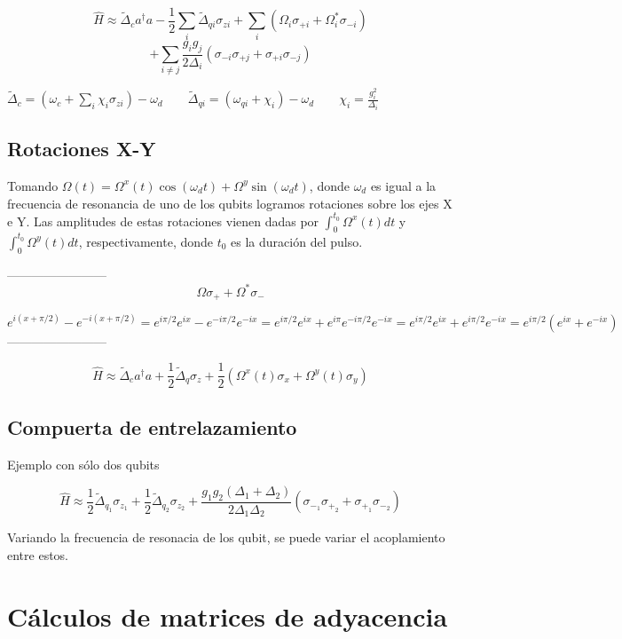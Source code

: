 \documentclass[11pt, spanish]{report}
\begin{document}
$$\hat{H} \approx \tilde{\Delta}_c a^\dagger a - \frac{1}{2} \sum\limits_i \tilde{\Delta}_{qi} \sigma_{zi} + \sum\limits_i (\Omega_i \sigma_{+i} + \Omega_i^* \sigma_{-i})$$
$$+ \sum\limits_{i \neq j} \frac{g_i g_j}{2 \Delta_i} (\sigma_{-i} \sigma_{+j}+\sigma_{+i} \sigma_{-j})$$

$\tilde{\Delta}_c = (\omega_c + \sum\limits_i \chi_i \sigma_{zi}) - \omega_d \qquad \tilde{\Delta}_{qi} = (\omega_{qi} + \chi_i) - \omega_d \qquad \chi_i = \frac{g_i^2}{\Delta_i}$

\section{Rotaciones X-Y}

Tomando $\Omega(t) = \Omega^x(t) \cos(\omega_d t) + \Omega^y \sin(\omega_d t)$, donde $\omega_d$ es igual a la frecuencia de resonancia de uno de los qubits logramos rotaciones sobre los ejes X e Y. Las amplitudes de estas rotaciones vienen dadas por $\int_0^{t_0} \Omega^x(t) dt$ y $\int_0^{t_0} \Omega^y(t) dt$, respectivamente, donde $t_0$ es la duración del pulso.

------------------------
$$ \Omega \sigma_+ + \Omega^* \sigma_- $$

$$ e^{i(x+\pi/2)}-e^{-i(x+\pi/2)} = e^{i\pi/2}e^{ix}-e^{-i\pi/2}e^{-ix} =
e^{i\pi/2}e^{ix}+e^{i\pi}e^{-i\pi/2}e^{-ix} = e^{i\pi/2}e^{ix}+e^{i\pi/2}e^{-ix} = e^{i\pi/2}(e^{ix}+e^{-ix})$$
------------------------

$$\hat{H} \approx \tilde{\Delta}_c a^\dagger a + \frac{1}{2} \tilde{\Delta}_q \sigma_z + \frac{1}{2} (\Omega^x(t) \sigma_x + \Omega^y(t) \sigma_y)$$

\section{Compuerta de entrelazamiento}

Ejemplo con sólo dos qubits

$$\hat{H} \approx \frac{1}{2} \tilde{\Delta}_{q_1} \sigma_{z_1} + \frac{1}{2} \tilde{\Delta}_{q_2} \sigma_{z_2} + \frac{g_1 g_2 (\Delta_1 + \Delta_2)}{2 \Delta_1 \Delta_2} (\sigma_{-_1} \sigma_{+_2} + \sigma_{+_1} \sigma_{-_2})$$

Variando la frecuencia de resonacia de los qubit, se puede variar el acoplamiento entre estos. 

\chapter{Cálculos de matrices de adyacencia}
\end{document}
